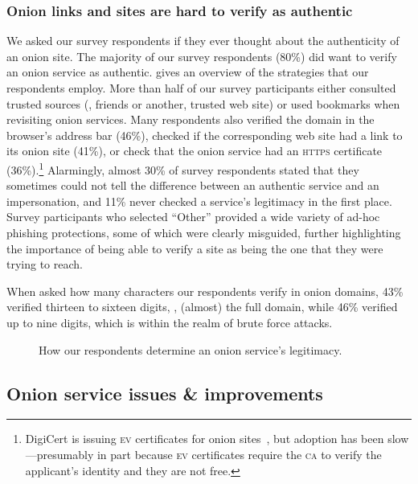 \subsubsection{Onion links and sites are hard to verify as authentic}
We asked our survey respondents if they ever thought about the authenticity of an onion
site.  The majority of our survey respondents (80\%) did want to verify an onion service as authentic.   gives an overview of the
strategies that our respondents employ.  More than half of our survey participants either consulted trusted
sources (\eg, friends or another, trusted web site) or used bookmarks when
revisiting onion services.  Many respondents also verified the domain in the
browser's address bar (46\%), checked if the corresponding web site had a link to
its onion site (41\%), or check that the onion service had an \textsc{https}
certificate (36\%).\footnote{DigiCert is issuing \textsc{ev} certificates for
onion sites~\cite{DigiCert2015a}, but adoption has been slow---presumably in part
because \textsc{ev} certificates require the \textsc{ca} to verify the
applicant's identity and they are not free.}  Alarmingly, almost 30\% of
survey respondents stated that they sometimes could not tell the difference between an
authentic service and an impersonation, and 11\% never checked a service's
legitimacy in the first place.  Survey participants who selected ``Other'' provided a wide
variety of ad-hoc phishing protections, some of which were clearly misguided, 
further highlighting the importance of being able to verify a site as being the one that they were trying to reach.

When asked how many characters our respondents verify in
onion domains,  43\% verified thirteen to sixteen digits, \ie, (almost) the full
domain, while 46\% verified up to nine digits, which is within the realm of brute
force attacks.

\begin{figure}[t]
    \centering
    
    \caption{How our respondents determine an onion service's legitimacy.}
    \label{fig:determining-legitimacy}
\end{figure}


\subsection{Onion service issues \& improvements}
\label{sec:improve}

